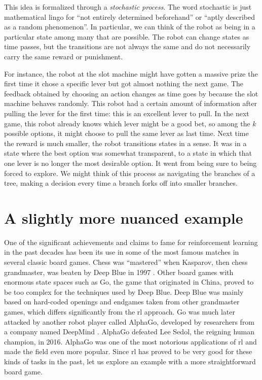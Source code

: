 This idea is formalized through a \textit{stochastic process}. The word
stochastic is just mathematical lingo for ``not entirely determined beforehand''
or ``aptly described as a random phenomenon''. In particular, we can think of
the robot as being in a particular state among many that are possible. The robot
can change states as time passes, but the transitions are not always the same
and do not necessarily carry the same reward or punishment.

For instance, the robot at the slot machine might have gotten a massive prize
the first time it chose a specific lever but got almost nothing the next game.
The feedback obtained by choosing an action changes as time goes by because the
slot machine behaves randomly. This robot had a certain amount of information
after pulling the lever for the first time: this is an excellent lever to pull.
In the next game, this robot already knows which lever might be a good bet, so
among the $k$ possible options, it might choose to pull the same lever as last
time. Next time the reward is much smaller, the robot transitions states in a
sense. It was in a state where the best option was somewhat transparent, to a
state in which that one lever is no longer the most desirable option. It went
from being sure to being forced to explore. We might think of this process as
navigating the branches of a tree, making a decision every time a branch forks
off into smaller branches.

\section{A slightly more nuanced example}

One of the significant achievements and claims to fame for reinforcement
learning in the past decades has been its use in some of the most famous matches
in several classic board games. Chess was ``mastered'' when Kasparov, then chess
grandmaster, was beaten by Deep Blue in 1997 \cite{silverchess}. Other board
games with enormous state spaces such as Go, the game that originated in China,
proved to be too complex for the techniques used by Deep Blue. Deep Blue was
mainly based on hard-coded openings and end\-ga\-mes taken from other grandmaster
games, which differs significantly from the \ac{rl} approach. Go was much later
attacked by another robot player called AlphaGo, developed by researchers from a
company named DeepMind \cite{silver2017mastering}. AlphaGo defeated Lee Sedol,
the reigning human champion, in 2016. AlphaGo was one of the most notorious
applications of \ac{rl} and made the field even more popular. Since \ac{rl} has
proved to be very good for these kinds of tasks in the past, let us explore an
example with a more straightforward board game.

